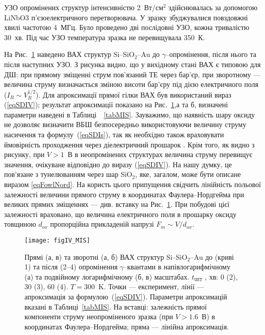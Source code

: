 \documentclass[a4paper,14pt,oneside,openany]{memoir}
\begin{document}
УЗО опромінених структур інтенсивністю 2~Вт/см$^2$ здійснювалась за допомогою LiNbO$3$ п'єзоелектричного перетворювача.
У зразку збуджувалися повздовжні хвилі частотою 4~МГц.
Було проведено дві послідовні УЗО, кожна тривалістю 30~хв.
Під час УЗО температура зразка не перевищувала 350~К.

На Рис.~\ref{figIV_MIS} наведено ВАХ структур  Si--SiO$_2$--Au до $\gamma$--опромінення, після нього та після наступних УЗО.
З рисунка видно, що у вихідному стані ВАХ є типовою для ДШ:
при прямому зміщенні струм пов'язаний ТЕ через бар'єр,
при зворотному --- величина струму визначається зміною висоти бар'єру під дією електричного поля ($I_R\sim V_R^{1/2}$).
Для апроксимації прямої гілки ВАХ був використаний вираз (\ref{eqSDIV});
результат апроксимації показано на Рис.~\ref{figIV_MIS},а та б, визначені параметри
наведені в Таблиці~~\ref{tabMIS}.
Зауважимо, що наявність шару оксиду не дозволяє визначити ВБШ безпосередньо використовуючи величину струму насичення та формулу~(\ref{eqSDIs}), так як необхідно також враховувати ймовірність проходження через діелектричний прошарок \cite{OZBEK2011,Kobayashi}.
Крім того, як видно з рисунку, при $V>1$~В в неопромінених структурах величина струму перевищує значення, очікуване відповідно до виразу (\ref{eqSDIV}).
На нашу думку, це пов'язане з тунелюванням через шар SiO$_2$, яке, загалом, може бути описане виразом \ref{eqFowlNord}.
На користь цього припущення свідчить лінійність польової залежності величини прямого струму в координатах Фаулера--Нордгейма при великих прямих зміщеннях --- див. вставку на Рис.~\ref{figIV_MIS}.
При побудові цієї залежності враховано, що величина електричного поля в прошарку оксиду товщиною $d_{ox}$ пропорційна прикладеній напрузі $F_m\sim V/d_{ox}$.

\begin{figure}
\center
\texttt{[image: figIV\_MIS]}%
\caption{\label{figIV_MIS}
Прямі (а, в) та зворотні (а, б) ВАХ структур Si--SiO$_2$--Au до (криві 1)
та після (2--4) опромінення $\gamma$--квантами в напівлогарифмічному (а)
та подвійному логарифмічному (б, в) масштабах.
$t_\mathtt{UST}$ , хв: 0 (2), 30 (3), 60 (4).
$T=300$~K.
Точки --- експеримент,
лінії --- апроксимація за формулою~(\ref{eqSDIV}).
Параметри апроксимацій вказані в Таблиці~\ref{tabMIS}.
На вставці:
залежність прямої компоненти струму неопроміненого зразка (при $V>1.6$~В) в координатах Фаулера--Нордгейма;
пряма --- лінійна апроксимація.
}%
\end{figure}
\end{document}
